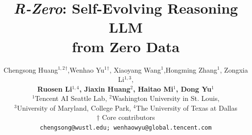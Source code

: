 \documentclass{article} %
\title{\textit{\textbf{R-Zero}}: Self-Evolving Reasoning LLM \\ from Zero Data}
\author{Chengsong Huang$^{1,2}$$^\dagger$,Wenhao Yu$^1$$^\dagger$, Xiaoyang Wang$^1$,Hongming Zhang$^1$, Zongxia Li$^{1,3}$, \\
\textbf{Ruosen Li$^{1,4}$, Jiaxin Huang$^2$, Haitao Mi$^1$, Dong Yu$^1$}
\\
$^1$Tencent  AI Seattle Lab,
$^2$Washington University in St. Louis,\\
$^3$University of Maryland, College Park,
$^4$The University of Texas at Dallas
\\
$\dagger$ Core contributors 
\\
\texttt{chengsong@wustl.edu; wenhaowyu@global.tencent.com}
}
\begin{document}
\maketitle

\begin{abstract}

\end{abstract}



















\clearpage
\appendix




\end{document}
